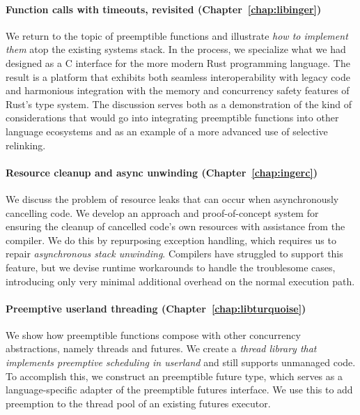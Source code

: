 \paragraph{Function calls with timeouts, revisited (Chapter~\ref{chap:libinger})}
We return to the topic of preemptible functions and illustrate \textit{how to
implement them}
atop the existing systems stack.  In the process, we specialize what we had designed
as a C interface for the more modern Rust programming language.  The result is a
platform that exhibits both seamless interoperability with legacy code and harmonious
integration with the memory and concurrency safety features of Rust's type system.
The discussion serves both as a demonstration of the kind of considerations that
would go into integrating preemptible functions into other language ecosystems and as
an example of a more advanced use of selective relinking.

\paragraph{Resource cleanup and async unwinding (Chapter~\ref{chap:ingerc})}
We discuss the problem of resource leaks that can occur when asynchronously
cancelling code.  We develop an approach and proof-of-concept system for ensuring the
cleanup of cancelled code's own resources with assistance from the compiler.  We do
this by repurposing exception handling, which requires us to repair
\textit{asynchronous stack unwinding}.  Compilers have struggled to support this
feature, but we devise runtime workarounds to handle the troublesome cases,
introducing only very minimal additional overhead on the normal execution path.

\paragraph{Preemptive userland threading (Chapter~\ref{chap:libturquoise})}
We show how preemptible functions compose with other concurrency abstractions, namely
threads and futures.  We create a \textit{thread library that implements preemptive
scheduling in userland} and still supports unmanaged code.  To accomplish this, we
construct an preemptible future type, which serves as a language-specific adapter of
the preemptible futures interface.  We use this to add preemption to the thread pool
of an existing futures executor.

